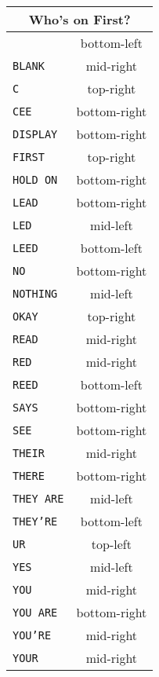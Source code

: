 \documentclass[11pt]{article}
\begin{document}
\begin{multicols}{3}

\begin{tabular}{|l|c|}
\hline
\multicolumn{2}{|c|}{Who's on First?} \\
\hline
\texttt{}         & bottom-left  \\ \hline
\texttt{BLANK}    & mid-right    \\ \hline
\texttt{C}        & top-right    \\ \hline
\texttt{CEE}      & bottom-right \\ \hline
\texttt{DISPLAY}  & bottom-right \\ \hline
\texttt{FIRST}    & top-right    \\ \hline
\texttt{HOLD ON}  & bottom-right \\ \hline
\texttt{LEAD}     & bottom-right \\ \hline
\texttt{LED}      & mid-left     \\ \hline
\texttt{LEED}     & bottom-left  \\ \hline
\texttt{NO}       & bottom-right \\ \hline
\texttt{NOTHING}  & mid-left     \\ \hline
\texttt{OKAY}     & top-right    \\ \hline
\texttt{READ}     & mid-right    \\ \hline
\texttt{RED}      & mid-right    \\ \hline
\texttt{REED}     & bottom-left  \\ \hline
\texttt{SAYS}     & bottom-right \\ \hline
\texttt{SEE}      & bottom-right \\ \hline
\texttt{THEIR}    & mid-right    \\ \hline
\texttt{THERE}    & bottom-right \\ \hline
\texttt{THEY ARE} & mid-left     \\ \hline
\texttt{THEY'RE}  & bottom-left  \\ \hline
\texttt{UR}       & top-left     \\ \hline
\texttt{YES}      & mid-left     \\ \hline
\texttt{YOU}      & mid-right    \\ \hline
\texttt{YOU ARE}  & bottom-right \\ \hline
\texttt{YOU'RE}   & mid-right    \\ \hline
\texttt{YOUR}     & mid-right    \\ \hline
\end{tabular}


\end{multicols}
\end{document}
